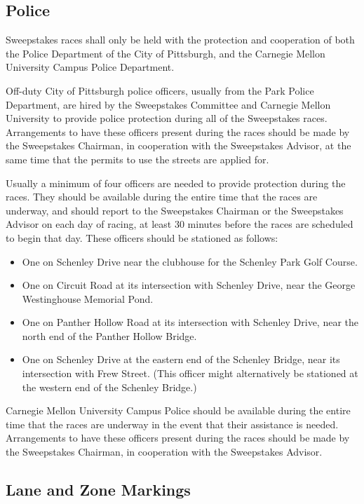 \subsection{Police}

Sweepstakes races shall only be held with the protection and cooperation of both the Police Department of the City of Pittsburgh, and the Carnegie Mellon University Campus Police Department.

Off-duty City of Pittsburgh police officers, usually from the Park Police Department, are hired by the Sweepstakes Committee and Carnegie Mellon University to provide police protection during all of the Sweepstakes races. Arrangements to have these officers present during the races should be made by the Sweepstakes Chairman, in cooperation with the Sweepstakes Advisor, at the same time that the permits to use the streets are applied for.

Usually a minimum of four officers are needed to provide protection during the races. They should be available during the entire time that the races are underway, and should report to the Sweepstakes Chairman or the Sweepstakes Advisor on each day of racing, at least 30 minutes before the races are scheduled to begin that day. These officers should be stationed as follows:
\begin{itemize}
	\item One on Schenley Drive near the clubhouse for the Schenley Park Golf Course.
	\item One on Circuit Road at its intersection with Schenley Drive, near the George Westinghouse Memorial Pond.
	\item One on Panther Hollow Road at its intersection with Schenley Drive, near the north end of the Panther Hollow Bridge.
	\item One on Schenley Drive at the eastern end of the Schenley Bridge, near its intersection with Frew Street. (This officer might alternatively be stationed at the western end of the Schenley Bridge.)
\end{itemize}

Carnegie Mellon University Campus Police should be available during the entire time that the races are underway in the event that their assistance is needed. Arrangements to have these officers present during the races should be made by the Sweepstakes Chairman, in cooperation with the Sweepstakes Advisor.

\subsection{Lane and Zone Markings}

